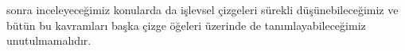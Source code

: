 \documentclass[11pt]{amsbook}
\begin{document}

sonra inceleyeceğimiz konularda da işlevsel çizgeleri sürekli düşünebileceğimiz ve bütün bu kavramları başka çizge öğeleri üzerinde de tanımlayabileceğimiz unutulmamalıdır.
\end{document}
